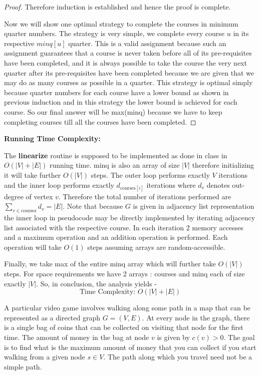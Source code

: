 \documentclass[answers]{exam}
\begin{document}
\begin{questions}
\begin{solution}
\begin{proof}
Therefore induction is established and hence the proof is complete.

Now we will show one optimal strategy to complete the courses in minimum quarter numbers. The strategy is very simple, we complete every course $u$ in its respective $minq[u]$ quarter. This is a valid assignment because such an assignment guarantees that a course is never taken before all of its pre-requisites have been completed, and it is always possible to take the course the very next quarter after its pre-requisites have been completed because we are given that we may do as many courses as possible in a quarter. This strategy is optimal simply because quarter numbers for each course have a lower bound as shown in previous induction and in this strategy the lower bound is achieved for each course. So our final answer will be max(minq) because we have to keep completing courses till all the courses have been completed.
\end{proof}

\textbf{Running Time Complexity: }

The \textbf{linearize} routine is supposed to be implemented as done in class in $O(|V|+|E|)$ running time. minq is also an array of size $|V|$ therefore initializing it will take further $O(|V|)$ steps. The outer loop performs exactly $V$ iterations and the inner loop performs exactly $d_{\text{courses}[i]}$ iterations where $d_v$ denotes out-degree of vertex $v$. Therefore the total number of iterations performed are $\sum_{v \in \text{courses}} d_v = |E|$. Note that because $G$ is given in adjacency list representation the inner loop in pseudocode may be directly implemented by iterating adjacency list associated with the respective course. In each iteration 2 memory accesses and a maximum operation and an addition operation is performed. Each operation will take $O(1)$ steps assuming arrays are random-accessible.

Finally, we take max of the entire minq array which will further take $O(|V|)$ steps. For space requirements we have 2 arrays : courses and minq each of size exactly $|V|$. So, in conclusion, the analysis yields -
\[
    \text{Time Complexity: } O (|V| + |E|)
\]
\end{solution}

\vspace{0.3in}

\question A particular  video game involves walking along some path in a map that can be represented as a directed graph $G = (V, E)$. 
At every node in the graph, there is a single bag of coins that can be collected on visiting that node for the first time. 
The amount of money in the bag at node $v$ is given by $c(v) > 0$.
The goal is to find what is the maximum amount of money that you can collect if you start walking from a given node $s \in V$.
The path along which you travel need not be a simple path. 


\end{questions}
\end{document}
